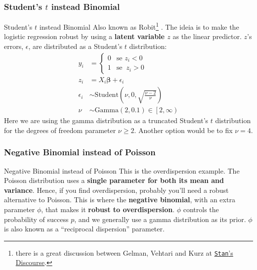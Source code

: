 \subsubsection{Student's $t$ instead Binomial}
\begin{frame}{Student's $t$ instead Binomial}
	\small
	Also known as Robit\footnote{there is a great discussion between
		Gelman, Vehtari and Kurz at
		\href{https://discourse.mc-stan.org/t/robit-regression-not-robust/21245/}{
			\texttt{Stan}'s Discourse}.} \parencite{gelman2013bayesian, gelman2020regression}.
	The ideia is to make the logistic regression robust by using a
	\textbf{latent variable $z$} as the linear predictor.
	$z$'s errors, $\epsilon$, are distributed as a Student's $t$ distribution:
	$$
		\begin{aligned}
			y_i        & = \begin{cases} 0 & \text{se } z_i < 0 \\ 1 & \text{se }\ z_i > 0 \end{cases}                                          \\
			z_i        & = X_i \boldsymbol{\beta} + \epsilon_i                                 \\
			\epsilon_i & \sim \text{Student} \left (\nu, 0, \sqrt{\frac{\nu - 2}{\nu}} \right) \\
			\nu        & \sim \text{Gamma}(2, 0.1) \in \left[2, \infty \right)
		\end{aligned}
	$$
	\footnotesize
	Here we are using the gamma distribution as a truncated Student's $t$
	distribution for the degrees of freedom parameter $\nu \geq 2$.
	Another option would be to fix $\nu = 4$.
\end{frame}

\subsubsection{Negative Binomial instead of Poisson}
\begin{frame}{Negative Binomial instead of Poisson}
	This is the overdispersion example.
	The Poisson distribution uses a \textbf{single parameter for both its mean and variance}.
	\vfill
	Hence, if you find overdispersion, probably you'll need a robust alternative to Poisson.
	This is where the \textbf{negative binomial}, with an extra parameter $\phi$,
	that makes it \textbf{robust to overdispersion}.
	\vfill
	$\phi$ controls the probability of success $p$,
	and we generally use a gamma distribution as its prior.
	$\phi$ is also known as a ``reciprocal dispersion'' parameter.
\end{frame}

